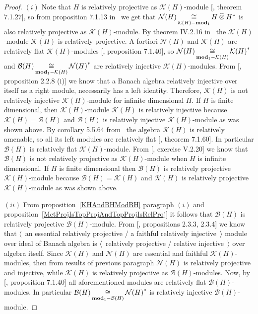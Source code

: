 \begin{proof} $(i)$ Note that $H$ is relatively projective as
$\mathcal{K}(H)$-module [\cite{HelBanLocConvAlg}, theorem 7.1.27], so from
proposition 7.1.13 in~\cite{HelBanLocConvAlg} we get that
$\mathcal{N}(H)\mathop{\mathbin{\cong}}\limits_{\mathcal{K}(H)-\mathbf{mod}_1}H\mathbin{\widehat{\otimes}} H^*$ is also
relatively projective as $\mathcal{K}(H)$-module. By theorem IV.2.16
in~\cite{HelHomolBanTopAlg} the $\mathcal{K}(H)$-module $\mathcal{K}(H)$ is
relatively projective. A fortiori $\mathcal{N}(H)$ and $\mathcal{K}(H)$ are
relatively flat $\mathcal{K}(H)$-modules 
[\cite{HelBanLocConvAlg}, proposition 7.1.40], 
so $\mathcal{N}(H)\mathop{\mathbin{\cong}}\limits_{\mathbf{mod}_1-\mathcal{K}(H)}{\mathcal{K}(H)}^*$
and  $\mathcal{B}(H)\mathop{\mathbin{\cong}}\limits_{\mathbf{mod}_1-\mathcal{K}(H)}{\mathcal{N}(H)}^*$ are
relatively injective $\mathcal{K}(H)$-modules. From
[\cite{RamsHomPropSemgroupAlg}, proposition 2.2.8  (i)] we know that a Banach
algebra relatively injective over itself as a right module, necessarily has a
left identity. Therefore, $\mathcal{K}(H)$ is not relatively injective
$\mathcal{K}(H)$-module for infinite dimensional $H$. If $H$ is finite
dimensional, then $\mathcal{K}(H)$-module $\mathcal{K}(H)$ is relatively
injective because $\mathcal{K}(H)=\mathcal{B}(H)$ and $\mathcal{B}(H)$ is
relatively injective $\mathcal{K}(H)$-module as was shown above. By corollary
5.5.64 from~\cite{DalBanAlgAutCont} the algebra $\mathcal{K}(H)$ is relatively
amenable, so all its left modules are relatively flat [\cite{HelBanLocConvAlg},
theorem 7.1.60]. In particular $\mathcal{B}(H)$ is relatively flat
$\mathcal{K}(H)$-module. From [\cite{HelHomolBanTopAlg}, exercise V.2.20] we
know that $\mathcal{B}(H)$ is not relatively projective as
$\mathcal{K}(H)$-module when $H$ is infinite dimensional. If $H$ is finite
dimensional then $\mathcal{B}(H)$ is relatively projective
$\mathcal{K}(H)$-module because $\mathcal{B}(H)=\mathcal{K}(H)$ and
$\mathcal{K}(H)$ is relatively projective $\mathcal{K}(H)$-module as was shown
above.

$(ii)$ From proposition~\ref{KHAndBHModBH} paragraph $(i)$ and
proposition~\ref{MetProjIsTopProjAndTopProjIsRelProj} it follows that
$\mathcal{B}(H)$ is relatively projective $\mathcal{B}(H)$-module. From
[\cite{RamsHomPropSemgroupAlg}, propositions 2.3.3, 2.3.4] we know that
$\langle$~an essential relatively projective / a faithful relatively
injective~$\rangle$ module over ideal of Banach algebra is $\langle$~relatively
projective / relative injective~$\rangle$ over algebra itself. Since
$\mathcal{K}(H)$ and $\mathcal{N}(H)$ are essential and faithful
$\mathcal{K}(H)$-modules, then from results of previous paragraph
$\mathcal{N}(H)$ is relatively projective and injective, while $\mathcal{K}(H)$
is relatively projective as $\mathcal{B}(H)$-modules. Now, by
[\cite{HelBanLocConvAlg}, proposition 7.1.40] all aforementioned modules are
relatively flat $\mathcal{B}(H)$-modules. In particular
$\mathcal{B}(H)\mathop{\mathbin{\cong}}\limits_{\mathbf{mod}_1-\mathcal{B}(H)}{\mathcal{N}(H)}^*$ is
relatively injective $\mathcal{B}(H)$-module.
\end{proof}

